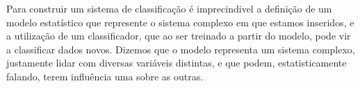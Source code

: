 
Para construir um sistema de classificação é imprecindivel a definição de um modelo estatístico que represente o sistema complexo em que estamos inseridos, e a utilização de um classificador, que ao ser treinado a partir do modelo, pode vir a classificar dados novos. Dizemos que o modelo representa um sistema complexo, justamente lidar com diversas variáveis distintas, e que podem, estatisticamente falando, terem influência uma sobre as outras.
